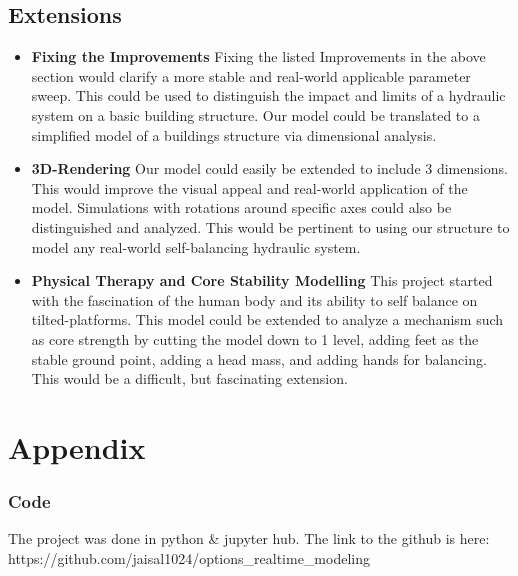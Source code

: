 \documentclass{article}
\begin{document}
\subsection{Extensions}
\begin{flushleft} 
\begin{itemize}
  \item \textbf{Fixing the Improvements} \newline
  \tabHorizontal Fixing the listed Improvements in the above section would clarify a more stable and real-world applicable parameter sweep. This could be used to distinguish the impact and limits of a hydraulic system on a basic building structure. Our model could be translated to a simplified model of a buildings structure via dimensional analysis.  
  \item \textbf{3D-Rendering} \newline
  \tabHorizontal Our model could easily be extended to include 3 dimensions. This would improve the visual appeal and real-world application of the model. Simulations with rotations around specific axes could also be distinguished and analyzed. This would be pertinent to using our structure to model any real-world self-balancing hydraulic system. 
  \item \textbf{Physical Therapy and Core Stability Modelling} \newline
  \tabHorizontal This project started with the fascination of the human body and its ability to self balance on tilted-platforms. This model could be extended to analyze a mechanism such as core strength by cutting the model down to 1 level, adding feet as the stable ground point, adding a head mass, and adding hands for balancing. This would be a difficult, but fascinating extension. 
\end{itemize}
\end{flushleft}


\section{Appendix}
\subsubsection{Code}
\begin{flushleft}
 The project was done in python & jupyter hub. The link to the github is here: https://github.com/jaisal1024/options_realtime_modeling
\end{flushleft}
\end{document}
